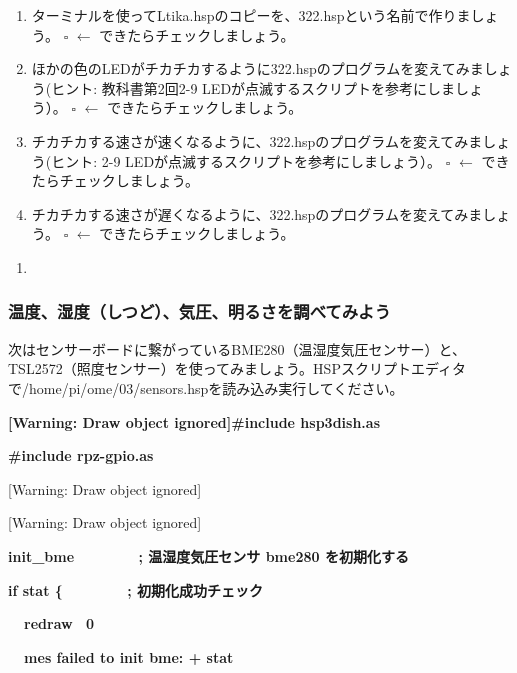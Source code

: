 \documentclass[a4paper,dvipdfmx]{jarticle}
\begin{document}
\begin{enumerate}
\item
ターミナルを使ってLtika.hspのコピーを、322.hspという名前で作りましょう。\newline
${\square}$ $\leftarrow $
できたらチェックしましょう。
\item
ほかの色のLEDがチカチカするように322.hspのプログラムを変えてみましょう(ヒント:
教科書第2回2-9
LEDが点滅するスクリプトを参考にしましょう）。\newline
${\square}$ $\leftarrow $
できたらチェックしましょう。
\item
チカチカする速さが速くなるように、322.hspのプログラムを変えてみましょう(ヒント:
2-9
LEDが点滅するスクリプトを参考にしましょう）。\newline
${\square}$ $\leftarrow $
できたらチェックしましょう。
\item
チカチカする速さが遅くなるように、322.hspのプログラムを変えてみましょう。\newline
${\square}$ $\leftarrow $
できたらチェックしましょう。
\end{enumerate}
\begin{enumerate}
\item[] 
\bigskip
\end{enumerate}
\clearpage\subsubsection{温度、湿度（しつど）、気圧、明るさを調べてみよう}
次はセンサーボードに繋がっているBME280（温湿度気圧センサー）と、TSL2572（照度センサー）を使ってみましょう。HSPスクリプトエディタで/home/pi/ome/03/sensors.hspを読み込み実行してください。

{\ttfamily\bfseries
[Warning: Draw object ignored]\#include {\textquotedbl}hsp3dish.as{\textquotedbl}}

{\ttfamily\bfseries
\#include {\textquotedbl}rpz-gpio.as{\textquotedbl}}

[Warning: Draw object ignored]

[Warning: Draw object ignored]

{\ttfamily\bfseries
init\_bme\ \ \ \ \ \ \ \ \textcolor[rgb]{0.0,0.0,0.8}{; 温湿度気圧センサ bme280
を初期化する}}

{\ttfamily\bfseries
if stat \{\ \ \ \ \ \ \ \ \textcolor[rgb]{0.0,0.0,0.8}{;
初期化成功チェック}}

{\ttfamily\bfseries
\ \ redraw \ 0}

{\ttfamily\bfseries
\ \ mes {\textquotedbl}failed to init bme: {\textquotedbl} + stat}
\end{document}
